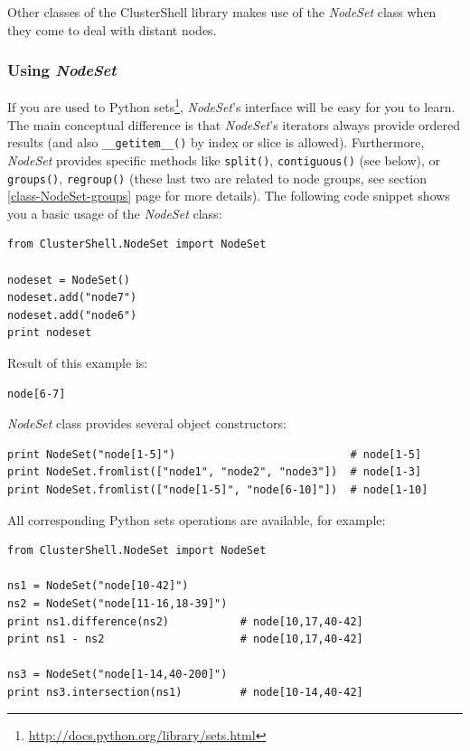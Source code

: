 \documentclass[english,a4paper]{csuserguide}
\newcommand{\NodeSet}{\textit{NodeSet}\xspace}
\begin{document}
Other classes of the ClusterShell library makes use of the \NodeSet class when they come to deal with distant nodes.

\subsubsection{Using \NodeSet}

If you are used to Python sets\footnote{\url{http://docs.python.org/library/sets.html}}, \NodeSet's interface will be easy for you to learn. The main conceptual difference is that \NodeSet's iterators always provide ordered results (and also  \lstinline+__getitem__()+ by index or slice is allowed). Furthermore, \NodeSet provides specific methods like  \lstinline+split()+,  \lstinline+contiguous()+ (see below), or  \lstinline+groups()+,  \lstinline+regroup()+ (these last two are related to node groups, see section  \ref{class-NodeSet-groups} page \pageref{class-NodeSet-groups} for more details). The following code snippet shows you a basic usage of the \NodeSet class:
\bigskip

\begin{lstlisting}[breaklines=true, breakatwhitespace=true]
from ClusterShell.NodeSet import NodeSet

nodeset = NodeSet()
nodeset.add("node7")
nodeset.add("node6")
print nodeset
\end{lstlisting}

Result of this example is:
\medskip
\begin{lstlisting}[breaklines=true, breakatwhitespace=true]
node[6-7]
\end{lstlisting}

\NodeSet class provides several object constructors:
\medskip
\begin{lstlisting}[breaklines=true, breakatwhitespace=true]
print NodeSet("node[1-5]")                           # node[1-5]
print NodeSet.fromlist(["node1", "node2", "node3"])  # node[1-3]
print NodeSet.fromlist(["node[1-5]", "node[6-10]"])  # node[1-10]
\end{lstlisting}

All corresponding Python sets operations are available, for example:
\medskip
\begin{lstlisting}[breaklines=true, breakatwhitespace=true]
from ClusterShell.NodeSet import NodeSet

ns1 = NodeSet("node[10-42]")
ns2 = NodeSet("node[11-16,18-39]")
print ns1.difference(ns2)           # node[10,17,40-42]
print ns1 - ns2                     # node[10,17,40-42]

ns3 = NodeSet("node[1-14,40-200]")
print ns3.intersection(ns1)         # node[10-14,40-42]
\end{lstlisting}
\end{document}
